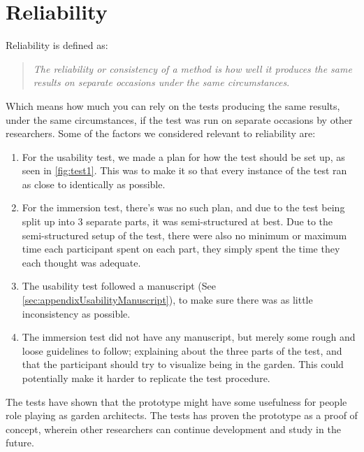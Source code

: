 \section*{Reliability}
	Reliability is defined as:\\
	\begin{quote}
		\textit{The reliability or consistency of a method is how well it produces the same results on separate occasions under the same circumstances}\cite[p.~442~Box~13.3]{interactionDesign}.\\
	\end{quote}
	Which means how much you can rely on the tests producing the same results, under the same circumstances, if the test was run on separate occasions by other researchers. Some of the factors we considered relevant to reliability are:\\
	\begin{enumerate}
		\item For the usability test, we made a plan for how the test should be set up, as seen in \autoref{fig:test1}. This was to make it so that every instance of the test ran as close to identically as possible.\\
		
		\item For the immersion test, there's was no such plan, and due to the test being split up into 3 separate parts, it was semi-structured at best. Due to the semi-structured setup of the test, there were also no minimum or maximum time each participant spent on each part, they simply spent the time they each thought was adequate.\\
		
		\item The usability test followed a manuscript (See \autoref{sec:appendixUsabilityManuscript}), to make sure there was as little inconsistency as possible.\\
		
		\item The immersion test did not have any manuscript, but merely some rough and loose guidelines to follow; explaining about the three parts of the test, and that the participant should try to visualize being in the garden. This could potentially make it harder to replicate the test procedure.\\
	\end{enumerate}
	The tests have shown that the prototype might have some usefulness for people role playing as garden architects. The tests has proven the prototype as a proof of concept, wherein other researchers can continue development and study in the future.
	

